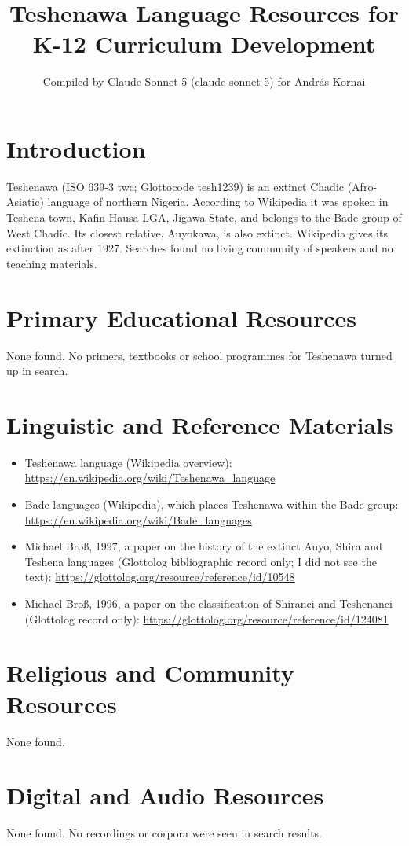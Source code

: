 \documentclass[12pt]{article}
\title{Teshenawa Language Resources for K-12 Curriculum Development}
\author{Compiled by Claude Sonnet 5 (claude-sonnet-5) for Andr\'as Kornai}
\date{}
\begin{document}
\maketitle

\section{Introduction}
Teshenawa (ISO 639-3 twc; Glottocode tesh1239) is an extinct Chadic (Afro-Asiatic) language of northern Nigeria. According to Wikipedia it was spoken in Teshena town, Kafin Hausa LGA, Jigawa State, and belongs to the Bade group of West Chadic. Its closest relative, Auyokawa, is also extinct. Wikipedia gives its extinction as after 1927. Searches found no living community of speakers and no teaching materials.

\section{Primary Educational Resources}
None found. No primers, textbooks or school programmes for Teshenawa turned up in search.

\section{Linguistic and Reference Materials}
\begin{itemize}
\item Teshenawa language (Wikipedia overview): \url{https://en.wikipedia.org/wiki/Teshenawa_language}
\item Bade languages (Wikipedia), which places Teshenawa within the Bade group: \url{https://en.wikipedia.org/wiki/Bade_languages}
\item Michael Bro\ss, 1997, a paper on the history of the extinct Auyo, Shira and Teshena languages (Glottolog bibliographic record only; I did not see the text): \url{https://glottolog.org/resource/reference/id/10548}
\item Michael Bro\ss, 1996, a paper on the classification of Shiranci and Teshenanci (Glottolog record only): \url{https://glottolog.org/resource/reference/id/124081}
\end{itemize}

\section{Religious and Community Resources}
None found.

\section{Digital and Audio Resources}
None found. No recordings or corpora were seen in search results.
\end{document}
